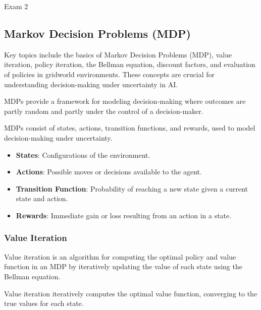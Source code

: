 \begin{examnotes}{Exam 2}
    \subsection*{Markov Decision Problems (MDP)}

    Key topics include the basics of Markov Decision Problems (MDP), value iteration, policy iteration, the Bellman equation, discount factors, and evaluation of policies in gridworld environments. 
    These concepts are crucial for understanding decision-making under uncertainty in AI.
    
    MDPs provide a framework for modeling decision-making where outcomes are partly random and partly under the control of a decision-maker.
    
    \begin{highlight}
        MDPs consist of states, actions, transition functions, and rewards, used to model decision-making under uncertainty.
        
        \begin{itemize}
            \item \textbf{States}: Configurations of the environment.
            \item \textbf{Actions}: Possible moves or decisions available to the agent.
            \item \textbf{Transition Function}: Probability of reaching a new state given a current state and action.
            \item \textbf{Rewards}: Immediate gain or loss resulting from an action in a state.
        \end{itemize}
    \end{highlight}
    
    \subsubsection*{Value Iteration}
    
    Value iteration is an algorithm for computing the optimal policy and value function in an MDP by iteratively updating the value of each state using the Bellman equation.
    
    \begin{highlight}
        Value iteration iteratively computes the optimal value function, converging to the true values for each state.
        

\end{highlight}
\end{examnotes}
